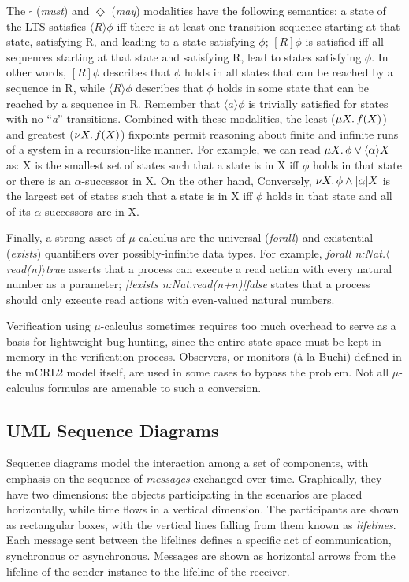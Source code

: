 \documentclass[letter]{llncs}
\begin{document}
The $\square$ (\emph{must}) and $\Diamond$ (\emph{may}) modalities  have the following semantics:
a state of the LTS satisfies $\langle R \rangle\phi$ iff there is at least one transition sequence 
starting at that state, satisfying R, and leading to a state satisfying $\phi$;
$[R]\phi$ is satisfied iff all sequences starting at that state and satisfying R, 
lead to states satisfying  $\phi$.
In other words, $[R]\phi$ describes that $\phi$ holds in all states that can be reached by a sequence in R,
while $\langle R \rangle\phi$ describes that $\phi$ holds in some state that can be reached by a sequence in R.
Remember that $\langle a \rangle\phi$ is trivially satisfied for states with no “\emph{a}” transitions.
Combined with these modalities, the least ($\mu X\ldotp f(X)$) and greatest
($\nu X\ldotp f(X)$) fixpoints permit reasoning about finite and infinite runs
of a system in a recursion-like manner.
For example, we can read $\mu X\ldotp\phi\vee\langle\alpha\rangle X$ as: X is
the smallest set of states such that a state is in X
iff $\phi$ holds in that state or there is an $\alpha$-successor in X. 
On the other hand, 
Conversely, $\nu X\ldotp\phi \wedge[\alpha]X$ is the largest set of states such that a state is in X iff
$\phi$ holds in that state and all of its $\alpha$-successors are in X.

Finally, a strong asset of $\mu$-calculus are the universal (\emph{forall}) and existential (\emph{exists}) quantifiers over possibly-infinite data types.
For example, \emph{forall n:Nat.$\langle$read(n)$\rangle$true} asserts that a process can execute a read action with every natural number as a parameter;
\emph{[!exists n:Nat.read(n+n)]false} states that a process should only execute read actions with even-valued natural numbers.

Verification using $\mu$-calculus sometimes requires too much overhead to serve as a basis for lightweight 
bug-hunting, since the entire state-space must be kept in memory in the verification process.
Observers, or monitors (\`{a} la Buchi) defined in the mCRL2 model itself, are used in some cases to bypass the problem.
Not all $\mu$-calculus formulas are amenable to such a conversion.

\subsection{UML Sequence Diagrams}

Sequence diagrams model the interaction among a set of components, with
emphasis on the sequence of \emph{messages} exchanged over time. Graphically, they have
two dimensions: the objects participating in the scenarios are placed horizontally, 
while time flows in a vertical dimension. The participants are shown as rectangular boxes, with the vertical lines
falling from them known as \emph{lifelines}. 
Each message sent between the lifelines defines a specific act of communication, synchronous or asynchronous.
Messages are shown as horizontal arrows from the lifeline of the sender instance to the lifeline of the receiver. 
\end{document}
